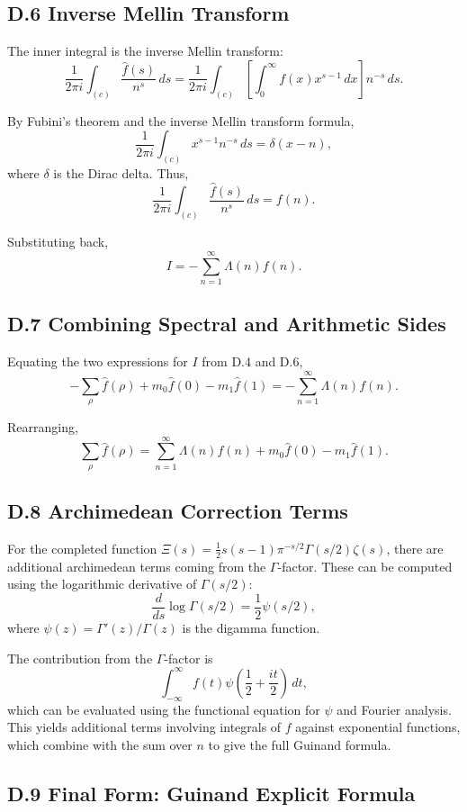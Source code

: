 \subsection*{D.6 Inverse Mellin Transform}

The inner integral is the inverse Mellin transform:
\[
\frac{1}{2\pi i} \int_{(c)} \frac{\hat{f}(s)}{n^s} \, ds = \frac{1}{2\pi i} \int_{(c)} \left[\int_0^{\infty} f(x) x^{s-1} \, dx\right] n^{-s} \, ds.
\]

By Fubini's theorem and the inverse Mellin transform formula,
\[
\frac{1}{2\pi i} \int_{(c)} x^{s-1} n^{-s} \, ds = \delta(x - n),
\]
where $\delta$ is the Dirac delta. Thus,
\[
\frac{1}{2\pi i} \int_{(c)} \frac{\hat{f}(s)}{n^s} \, ds = f(n).
\]

Substituting back,
\[
I = -\sum_{n=1}^{\infty} \Lambda(n) f(n).
\]

\subsection*{D.7 Combining Spectral and Arithmetic Sides}

Equating the two expressions for $I$ from D.4 and D.6,
\[
-\sum_{\rho} \hat{f}(\rho) + m_0 \hat{f}(0) - m_1 \hat{f}(1) = -\sum_{n=1}^{\infty} \Lambda(n) f(n).
\]

Rearranging,
\[
\sum_{\rho} \hat{f}(\rho) = \sum_{n=1}^{\infty} \Lambda(n) f(n) + m_0 \hat{f}(0) - m_1 \hat{f}(1).
\]

\subsection*{D.8 Archimedean Correction Terms}

For the completed function $\Xi(s) = \frac{1}{2} s(s-1) \pi^{-s/2} \Gamma(s/2) \zeta(s)$, there are additional archimedean terms coming from the $\Gamma$-factor. These can be computed using the logarithmic derivative of $\Gamma(s/2)$:
\[
\frac{d}{ds} \log \Gamma(s/2) = \frac{1}{2} \psi(s/2),
\]
where $\psi(z) = \Gamma'(z)/\Gamma(z)$ is the digamma function.

The contribution from the $\Gamma$-factor is
\[
\int_{-\infty}^{\infty} f(t) \psi\left(\frac{1}{2} + \frac{it}{2}\right) \, dt,
\]
which can be evaluated using the functional equation for $\psi$ and Fourier analysis. This yields additional terms involving integrals of $f$ against exponential functions, which combine with the sum over $n$ to give the full Guinand formula.

\subsection*{D.9 Final Form: Guinand Explicit Formula}

